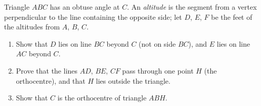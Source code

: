 Triangle $ABC$ has an obtuse angle at $C$. An \emph{altitude} is the segment from a vertex perpendicular to the line containing the opposite side; let $D$, $E$, $F$ be the feet of the altitudes from $A$, $B$, $C$.
\begin{enumerate}
\item[(a)] Show that $D$ lies on line $BC$ beyond $C$ (not on side $BC$), and $E$ lies on line $AC$ beyond $C$.
\item[(b)] Prove that the lines $AD$, $BE$, $CF$ pass through one point $H$ (the orthocentre), and that $H$ lies outside the triangle.
\item[(c)] Show that $C$ is the orthocentre of triangle $ABH$.
\end{enumerate}
